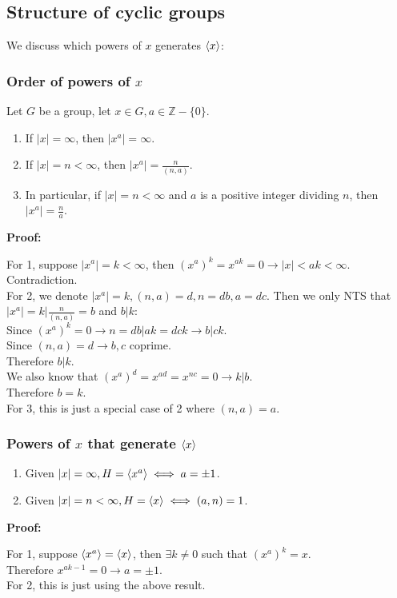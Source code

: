 \documentclass{article}
\begin{document}
\subsection*{Structure of cyclic groups}
We discuss which powers of $x$ generates $\braket{x}$:
\subsubsection*{Order of powers of $x$}
Let $G$ be a group, let $x \in G, a \in \mathbb{Z} - \{0\}$.
\begin{enumerate}
    \item If $|x| = \infty$, then $|x^a| = \infty$.
    \item If $|x| = n < \infty$, then $|x^a| = \frac{n}{(n, a)}$.
    \item In particular, if $|x| = n < \infty$ and $a$ is a positive integer dividing $n$, then $|x^a| = \frac{n}{a}$.
\end{enumerate}
\textbf{Proof:}
\begin{addmargin}[1em]{0em}
    For 1, suppose $|x^a| = k < \infty$, then $(x^a)^k = x^{ak} = 0 \rightarrow |x| < ak < \infty$. Contradiction.\\
    For 2, we denote $|x^a| = k, (n, a) = d, n = db, a = dc$. Then we only NTS that $|x^a| = k | \frac{n}{(n, a)} = b$ and $b | k$:\\
    Since $(x^a)^k = 0 \rightarrow n = db | ak = dck \rightarrow b | ck$.\\
    Since $(n, a) = d \rightarrow b, c$ coprime.\\
    Therefore $b | k$.\\
    We also know that $(x^a)^d = x^{ad} = x^{nc} = 0 \rightarrow k | b$.\\
    Therefore $b = k$.\\
    For 3, this is just a special case of 2 where $(n, a) = a$.
\end{addmargin}
\subsubsection*{Powers of $x$ that generate $\braket{x}$}
\begin{enumerate}
    \item Given $|x| = \infty, H = \braket{x^a} \iff a = \pm 1$.
    \item Given $|x| = n < \infty, H = \braket{x} \iff (a, n) = 1$.
\end{enumerate}
\textbf{Proof:}
\begin{addmargin}[1em]{0em}
    For 1, suppose $\braket{x^a} = \braket{x}$, then $\exists k \neq 0$ such that $(x^a)^k = x$.\\
    Therefore $x^{ak-1} = 0 \rightarrow a = \pm 1$.\\
    For 2, this is just using the above result.
\end{addmargin}
\end{document}
